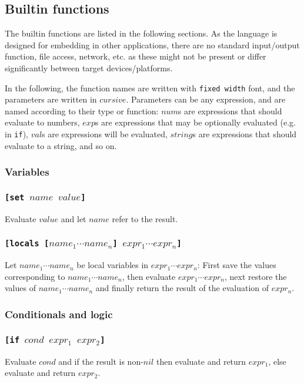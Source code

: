 \documentclass[11pt]{report}
\begin{document}
\subsection{Builtin functions}
The builtin functions are listed in the following sections. As the language is designed for embedding in other applications, there are no standard input/output function, file access, network, etc. as these might not be present or differ significantly between target devices/platforms.

In the following, the function names are written with {\tt fixed width} font, and the parameters are written in $cursive$. Parameters can be any expression, and are named according to their type or function: $num$s are expressions that should evaluate to numbers, $exp$s are expressions that may be optionally evaluated (e.g. in {\tt if}), $val$s are expressions will be evaluated, $string$s are expressions that should evaluate to a string, and so on.

\subsubsection{Variables}
\subsubsection*{\tt{[set }$name$ $value$\tt{]}}
Evaluate $value$ and let $name$ refer to the result.

\subsubsection*{\tt{[locals [}$name_1 \cdots name_n$\tt{]} $expr_1 \cdots expr_n$\tt{]}}
Let $name_1 \cdots name_n$ be local variables in $expr_1 \cdots expr_n$: First save the values corresponding to $name_1 \cdots name_n$, then evaluate $expr_1 \cdots expr_n$, next restore the values of $name_1 \cdots name_n$ and finally return the result of the evaluation of $expr_n$.

\subsubsection{Conditionals and logic}
\subsubsection*{\tt{[if }$cond$ $expr_1$ $expr_2$\tt{]}}
Evaluate $cond$ and if the result is non-$nil$ then evaluate and return $expr_1$, else evaluate and return $expr_2$.
\end{document}
